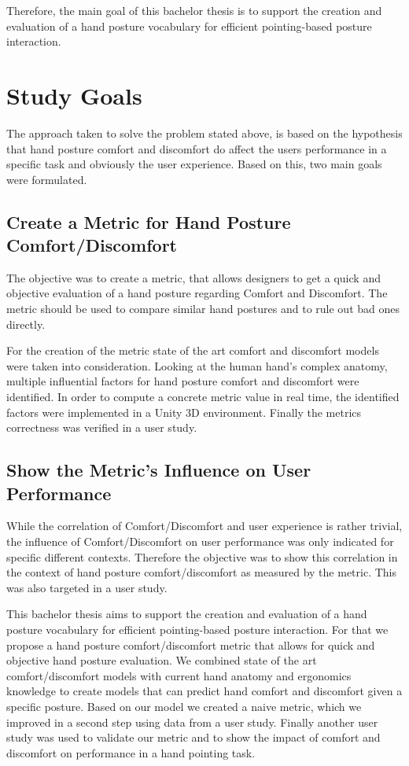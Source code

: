 Therefore, the main goal of this bachelor thesis is to support the creation and evaluation of a hand posture vocabulary for efficient pointing-based posture interaction.

\section{Study Goals}

The approach taken to solve the problem stated above, is based on the hypothesis that hand posture comfort and discomfort do affect the users performance in a specific task and obviously the user experience. Based on this, two main goals were formulated.

\subsection{Create a Metric for Hand Posture Comfort/Discomfort}

The objective was to create a metric, that allows designers to get a quick and objective evaluation of a hand posture regarding Comfort and Discomfort. The metric should be used to compare similar hand postures and to rule out bad ones directly. 

For the creation of the metric state of the art comfort and discomfort models were taken into consideration. Looking at the human hand's complex anatomy, multiple influential factors for hand posture comfort and discomfort were identified. In order to compute a concrete metric value in real time, the identified factors were implemented in a Unity 3D environment. Finally the metrics correctness was verified in a user study.

\subsection{Show the Metric's Influence on User Performance}

While the correlation of Comfort/Discomfort and user experience is rather trivial, the influence of Comfort/Discomfort on user performance was only indicated for specific different contexts. Therefore the objective was to show this correlation in the context of hand posture comfort/discomfort as measured by the metric. This was also targeted in a user study. 


This bachelor thesis aims to support the creation and evaluation of a hand posture vocabulary for efficient pointing-based posture interaction. For that we propose a hand posture comfort/discomfort metric that allows for quick and objective hand posture evaluation. We combined state of the art comfort/discomfort models with current hand anatomy and ergonomics knowledge to create models that can predict hand comfort and discomfort given a specific posture. Based on our model we created a naive metric, which we improved in a second step using data from a user study. Finally another user study was used to validate our metric and to show the impact of comfort and discomfort on performance in a hand pointing task.